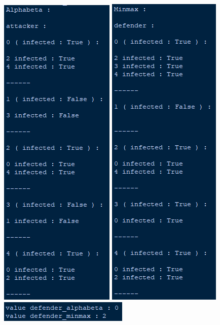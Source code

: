 \documentclass[a4paper,12pt]{article} %
\begin{document}
\begin{center}
\includegraphics[scale=0.7]{images/Capture7.PNG}
\includegraphics[scale=0.7]{images/Capture8.PNG}\\
\includegraphics[scale=1]{images/Capture9.PNG}
\end{center}
\end{document}
